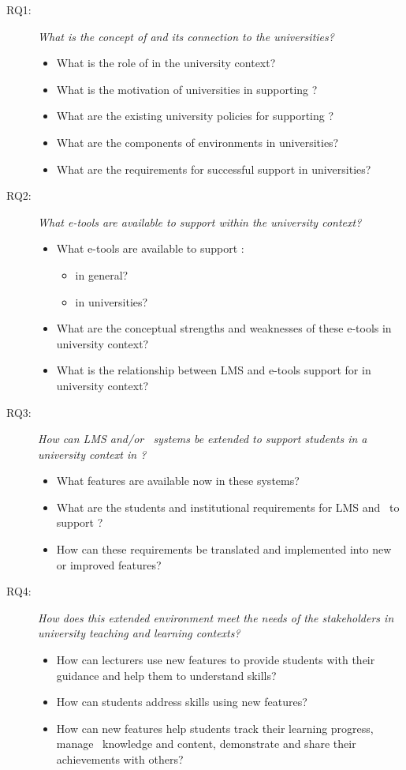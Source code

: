 \begin{description}
  \item[RQ1:] \textit{What is the concept of \LLLs and its connection to the
  universities?}
	\begin{itemize}
	  \item What is the role of \LLLs in the university context?
	  \item What is the motivation of universities in supporting \LLLsn?
  	  \item What are the existing university policies for supporting \LLLsn?
      \item What are the components of \LLLs environments in universities?
      \item What are the requirements for successful \LLLs support in
   universities?
	\end{itemize} 
	
   \item[RQ2:] \textit{What e-tools are available to support \LLLs within the
   university context?}
	\begin{itemize}
		\item What e-tools are available to support \LLLsn:
			\begin{itemize}
				\item in general?
				\item in universities?
			\end{itemize}
		\item What are the conceptual strengths and weaknesses of these e-tools in
		university context?
		\item What is the relationship between LMS and e-tools support for \LLLs in
		university context?
	\end{itemize}

	\item[RQ3:] \textit{How can LMS and/or \ep~systems be extended to support
	students in a university context in \LLLsn?}
	\begin{itemize}
		\item What features are available now in these systems?
		\item What are the students and institutional requirements for LMS and
		\ep~to support \LLLsn?
		\item How can these requirements be translated and implemented into new or
		improved features?
	\end{itemize}

	\item[RQ4:] \textit{How does this extended environment meet the needs of the
	stakeholders in university teaching and learning contexts?}
	\begin{itemize}
		\item How can lecturers use new features to provide students with their
		guidance and help them to understand \LLLs skills?
		\item How can students address \LLLs skills using new features?
		\item How can new features help students track their learning progress, manage
		\ep~knowledge and content, demonstrate and share their achievements with
		others?
	\end{itemize}
\end{description}


